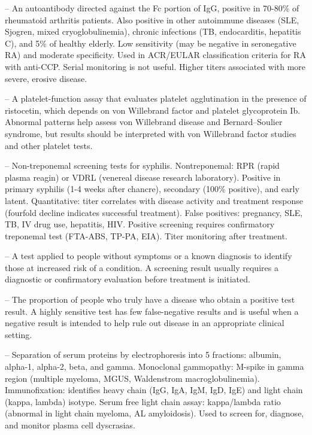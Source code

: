 -- An autoantibody directed against the Fc portion of IgG, positive in 70-80\% of rheumatoid arthritis patients. Also positive in other autoimmune diseases (SLE, Sjogren, mixed cryoglobulinemia), chronic infections (TB, endocarditis, hepatitis C), and 5\% of healthy elderly. Low sensitivity (may be negative in seronegative RA) and moderate specificity. Used in ACR/EULAR classification criteria for RA with anti-CCP. Serial monitoring is not useful. Higher titers associated with more severe, erosive disease.

-- A platelet-function assay that evaluates platelet agglutination in the presence of ristocetin, which depends on von Willebrand factor and platelet glycoprotein Ib. Abnormal patterns help assess von Willebrand disease and Bernard--Soulier syndrome, but results should be interpreted with von Willebrand factor studies and other platelet tests.

-- Non-treponemal screening tests for syphilis. Nontreponemal: RPR (rapid plasma reagin) or VDRL (venereal disease research laboratory). Positive in primary syphilis (1-4 weeks after chancre), secondary (100\% positive), and early latent. Quantitative: titer correlates with disease activity and treatment response (fourfold decline indicates successful treatment). False positives: pregnancy, SLE, TB, IV drug use, hepatitis, HIV. Positive screening requires confirmatory treponemal test (FTA-ABS, TP-PA, EIA). Titer monitoring after treatment.

-- A test applied to people without symptoms or a known diagnosis to identify those at increased risk of a condition. A screening result usually requires a diagnostic or confirmatory evaluation before treatment is initiated.

-- The proportion of people who truly have a disease who obtain a positive test result. A highly sensitive test has few false-negative results and is useful when a negative result is intended to help rule out disease in an appropriate clinical setting.

-- Separation of serum proteins by electrophoresis into 5 fractions: albumin, alpha-1, alpha-2, beta, and gamma. Monoclonal gammopathy: M-spike in gamma region (multiple myeloma, MGUS, Waldenstrom macroglobulinemia). Immunofixation: identifies heavy chain (IgG, IgA, IgM, IgD, IgE) and light chain (kappa, lambda) isotype. Serum free light chain assay: kappa/lambda ratio (abnormal in light chain myeloma, AL amyloidosis). Used to screen for, diagnose, and monitor plasma cell dyscrasias.

